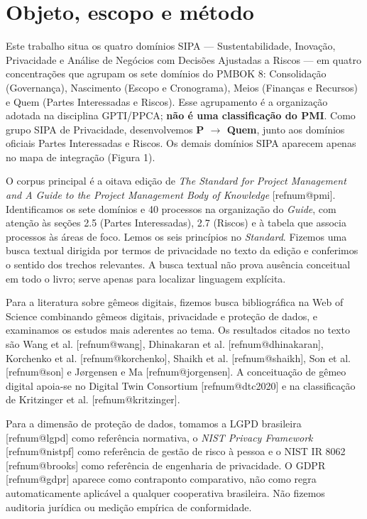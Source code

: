 \documentclass[11pt,a4paper]{article}
\makeatletter
\newcommand{\refnum}[1]{\csname refnum@#1\endcsname}
\makeatother
\begin{document}
\section{Objeto, escopo e método}

Este trabalho situa os quatro domínios SIPA — Sustentabilidade, Inovação, Privacidade e Análise de Negócios com Decisões Ajustadas a Riscos — em quatro concentrações que agrupam os sete domínios do PMBOK 8: Consolidação (Governança), Nascimento (Escopo e Cronograma), Meios (Finanças e Recursos) e Quem (Partes Interessadas e Riscos). Esse agrupamento é a organização adotada na disciplina GPTI/PPCA; \textbf{não é uma classificação do PMI}. Como grupo SIPA de Privacidade, desenvolvemos \textbf{P \ensuremath{\rightarrow} Quem}, junto aos domínios oficiais Partes Interessadas e Riscos. Os demais domínios SIPA aparecem apenas no mapa de integração (Figura 1).

O corpus principal é a oitava edição de \textit{The Standard for Project Management and A Guide to the Project Management Body of Knowledge} [\refnum{pmi}]. Identificamos os sete domínios e 40 processos na organização do \textit{Guide}, com atenção às seções 2.5 (Partes Interessadas), 2.7 (Riscos) e à tabela que associa processos às áreas de foco. Lemos os seis princípios no \textit{Standard}. Fizemos uma busca textual dirigida por termos de privacidade no texto da edição e conferimos o sentido dos trechos relevantes. A busca textual não prova ausência conceitual em todo o livro; serve apenas para localizar linguagem explícita.

Para a literatura sobre gêmeos digitais, fizemos busca bibliográfica na Web of Science combinando gêmeos digitais, privacidade e proteção de dados, e examinamos os estudos mais aderentes ao tema. Os resultados citados no texto são Wang et al. [\refnum{wang}], Dhinakaran et al. [\refnum{dhinakaran}], Korchenko et al. [\refnum{korchenko}], Shaikh et al. [\refnum{shaikh}], Son et al. [\refnum{son}] e Jørgensen e Ma [\refnum{jorgensen}]. A conceituação de gêmeo digital apoia-se no Digital Twin Consortium [\refnum{dtc2020}] e na classificação de Kritzinger et al. [\refnum{kritzinger}].

Para a dimensão de proteção de dados, tomamos a LGPD brasileira [\refnum{lgpd}] como referência normativa, o \textit{NIST Privacy Framework} [\refnum{nistpf}] como referência de gestão de risco à pessoa e o NIST IR 8062 [\refnum{brooks}] como referência de engenharia de privacidade. O GDPR [\refnum{gdpr}] aparece como contraponto comparativo, não como regra automaticamente aplicável a qualquer cooperativa brasileira. Não fizemos auditoria jurídica ou medição empírica de conformidade.
\end{document}
